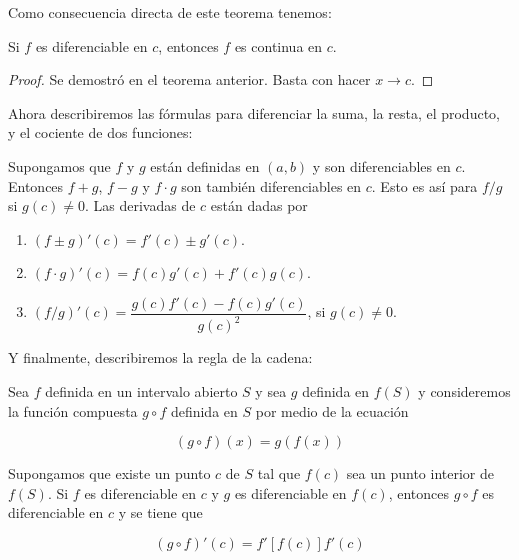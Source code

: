 Como consecuencia directa de este teorema tenemos:

\begin{teo}
    Si $f$ es diferenciable en $c$, entonces $f$ es continua en $c$.
\end{teo}

\begin{proof}
    Se demostró en el teorema anterior. Basta con hacer $x \to c$.
\end{proof}

Ahora describiremos las fórmulas para diferenciar la suma, la resta, el producto, y el cociente de dos funciones:

\begin{teo}
    Supongamos que $f$ y $g$ están definidas en $(a, b)$ y son diferenciables en $c$. Entonces $f+g$, $f-g$ y $f \cdot g$ son también diferenciables en $c$. Esto es así para $f / g$ si $g(c) \neq 0$. Las derivadas de $c$ están dadas por
    
    \begin{enumerate}
        \item $(f \pm g)'(c) = f'(c) \pm g'(c)$.
        \item $(f \cdot g)'(c) = f(c)g'(c) + f'(c)g(c)$.
        \item $(f/g)'(c) = \dfrac{g(c)f'(c) - f(c)g'(c)}{g(c)^2}$, si $g(c) \neq 0$.
    \end{enumerate}
\end{teo}

Y finalmente, describiremos la regla de la cadena:

\begin{teo}
    Sea $f$ definida en un intervalo abierto $S$ y sea $g$ definida en $f(S)$ y consideremos la función compuesta $g \circ f$ definida en $S$ por medio de la ecuación
    
    \[
    (g \circ f)(x) = g(f(x))
    \]
    
    Supongamos que existe un punto $c$ de $S$ tal que $f(c)$ sea un punto interior de $f(S)$. Si $f$ es diferenciable en $c$ y $g$ es diferenciable en $f(c)$, entonces $g \circ f$ es diferenciable en $c$ y se tiene que
    
    \[
    (g \circ f)'(c) = f'[f(c)]f'(c)
    \]
\end{teo}

